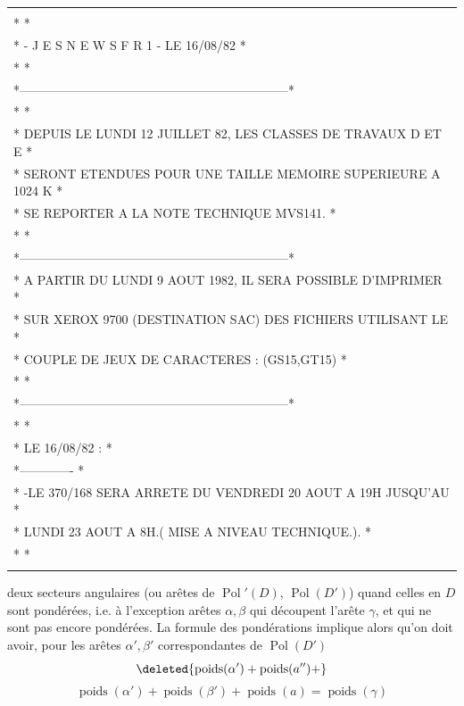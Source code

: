 {\ttfamily\begin{tabular}{l}
\unsure{*******************************************************************}\\
* *\\
* - J E S N E W S F R 1 - LE 16/08/82 *\\
* *\\
*-----------------------------------------------------------------*\\
* *\\
* DEPUIS LE LUNDI 12 JUILLET 82, LES CLASSES DE TRAVAUX D ET E *\\
* SERONT ETENDUES POUR UNE TAILLE MEMOIRE SUPERIEURE A 1024 K *\\
* SE REPORTER A LA NOTE TECHNIQUE MVS141. *\\
* *\\
*-----------------------------------------------------------------*\\
* A PARTIR DU LUNDI 9 AOUT 1982, IL SERA POSSIBLE D'IMPRIMER *\\
* SUR XEROX 9700 (DESTINATION SAC) DES FICHIERS UTILISANT LE *\\
* COUPLE DE JEUX DE CARACTERES : (GS15,GT15) *\\
* *\\
*-----------------------------------------------------------------*\\
* *\\
* LE 16/08/82 : *\\
*------------- *\\
* -LE 370/168 SERA ARRETE DU VENDREDI 20 AOUT A 19H JUSQU'AU *\\
* LUNDI 23 AOUT A 8H.( MISE A NIVEAU TECHNIQUE.). *\\
* *\\
\unsure{*******************************************************************}
\end{tabular}}


deux secteurs angulaires (ou arêtes de $\operatorname{Pol}'(D)$, $\operatorname{Pol}(D')$) quand celles en $D$ sont pondérées, i.e. à l'exception  arêtes  $\alpha,\beta$  qui découpent l'arête $\gamma$, et qui ne sont pas encore pondérées. La formule des pondérations implique alors qu'on doit avoir, pour les arêtes $\alpha',\beta'$ correspondantes de $\operatorname{Pol}(D')$
\[
\deleted{\operatorname{poids}(\alpha')+\operatorname{poids}(a'')+}
\]
\[
\operatorname{poids}(\alpha')+\operatorname{poids}(\beta')+\operatorname{poids}(a)=\operatorname{poids}(\gamma)
\]

